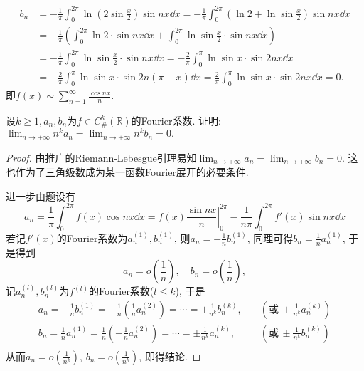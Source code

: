 \begin{quiza}
\begin{solution}
\[\begin{split}
b_n&=-\frac{1}{\pi}\int_{0}^{2\pi}\ln\left(2\sin\frac{x}{2}\right)\sin nx\dd x=-\frac{1}{\pi}\int_{0}^{2\pi}\left(\ln 2+\ln\sin\frac{x}{2}\right)\sin nx\dd x\\
&=-\frac{1}{\pi}\left(\int_{0}^{2\pi}\ln 2\cdot\sin nx\dd x+\int_{0}^{2\pi}\ln\sin\frac{x}{2}\cdot\sin nx\dd x\right)\\&=-\frac{1}{\pi}\int_{0}^{2\pi}\ln\sin\frac{x}{2}\cdot\sin nx\dd x=-\frac{2}{\pi}\int_{0}^{\pi}\ln\sin x\cdot\sin 2nx\dd x\\&=-\frac{2}{\pi}\int_{0}^{\pi}\ln\sin x\cdot\sin2n(\pi-x)\dd x=\frac{2}{\pi}\int_{0}^{\pi}\ln\sin x\cdot\sin 2nx\dd x=0.
\end{split}\]
即\(f(x)\sim\sum_{n=1}^{\infty}\frac{\cos nx}{n}.\)
\end{solution}
\woe 设\(k\geqslant 1,a_n,b_n\)为\(f\in C_{\#}^k(\mathbb{R})\)的Fourier系数. 证明: \(\lim_{n\rightarrow+\infty}n^ka_n=\lim_{n\rightarrow+\infty}n^kb_n=0.\)
\begin{proof}
由推广的Riemann-Lebesgue引理易知\(\lim_{n\rightarrow+\infty}a_n=\lim_{n\rightarrow+\infty}b_n=0\). 这也作为了三角级数成为某一函数Fourier展开的必要条件. 

进一步由题设有\[a_n=\frac{1}{\pi}\int_{0}^{2\pi}f(x)\cos nx\dd x=\left. f(x)\frac{\sin nx}{n}\right|^{2\pi}_{0}-\frac{1}{n\pi}\int_{0}^{2\pi}f'(x)\sin nx\dd x\]若记\(f'(x)\)的Fourier系数为\(a^{(1)}_n,b^{(1)}_n\), 则\(a_n=-\frac{1}{n}b^{(1)}_n\), 同理可得\(b_n=\frac{1}{n}a^{(1)}_n\), 于是得到\[a_n=o\left(\frac{1}{n}\right),\quad b_n=o\left(\frac{1}{n}\right),\]记\(a_n^{(l)},b_n^{(l)}\)为\(f^{(l)}\)的Fourier系数(\(l\leqslant k\)), 于是\[\begin{split}
a_n=-\frac{1}{n}b_n^{(1)}=-\frac{1}{n}\left(\frac{1}{n}a_n^{(2)}\right)=\cdots=\pm\frac{1}{n^k}b_n^{(k)},&\quad\left(\text{或}\,\pm\frac{1}{n^k}a_n^{(k)}\right)\\b_n=\frac{1}{n}a_n^{(1)}=\frac{1}{n}\left(-\frac{1}{n}a_n^{(2)}\right)=\cdots=\pm\frac{1}{n^k}a_n^{(k)},&\quad\left(\text{或}\,\pm\frac{1}{n^k}b_n^{(k)}\right)\\
\end{split}\]
从而\(a_n=o\left(\frac{1}{n^k}\right),\,b_n=o\left(\frac{1}{n^k}\right)\), 即得结论.
\end{proof}
\end{quiza}
